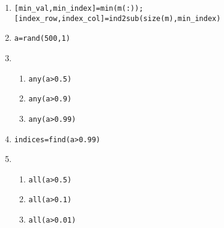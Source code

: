 \documentclass[a4paper]{article}
\begin{document}
	\begin{enumerate}
			\item \lstinline[style=Matlab-editor]![min_val,min_index]=min(m(:));[index_row,index_col]=ind2sub(size(m),min_index)!
			\item \lstinline[style=Matlab-editor]!a=rand(500,1)!
			\item 
				\begin{enumerate}
					\item \lstinline[style=Matlab-editor]!any(a>0.5)!
					\item \lstinline[style=Matlab-editor]!any(a>0.9)!
					\item \lstinline[style=Matlab-editor]!any(a>0.99)!
				\end{enumerate} 
			\item \lstinline[style=Matlab-editor]!indices=find(a>0.99)!
			\item 
				\begin{enumerate}
					\item \lstinline[style=Matlab-editor]!all(a>0.5)!
					\item \lstinline[style=Matlab-editor]!all(a>0.1)!
					\item \lstinline[style=Matlab-editor]!all(a>0.01)!
				\end{enumerate}
			
	\end{enumerate}
\end{document}
